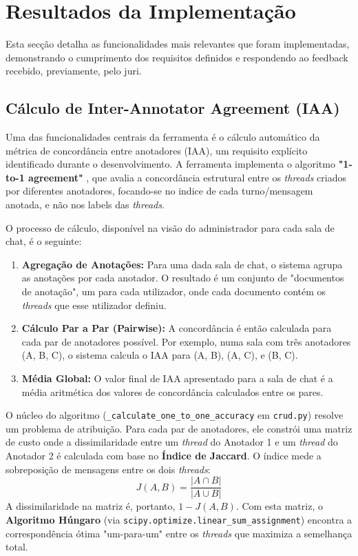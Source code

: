 \section{Resultados da Implementação}

Esta secção detalha as funcionalidades mais relevantes que foram implementadas, demonstrando o cumprimento dos requisitos definidos e respondendo ao feedback recebido, previamente, pelo juri.

\subsection{Cálculo de Inter-Annotator Agreement (IAA)}

Uma das funcionalidades centrais da ferramenta é o cálculo automático da métrica de concordância entre anotadores (IAA), um requisito explícito identificado durante o desenvolvimento. A ferramenta implementa o algoritmo \textbf{"1-to-1 agreement"} \cite{elsner2008you}, que avalia a concordância estrutural entre os \textit{threads} criados por diferentes anotadores, focando-se no indice de cada turno/mensagem anotada, e não nos labels das \textit{threads}.

O processo de cálculo, disponível na visão do administrador para cada sala de chat, é o seguinte:
\begin{enumerate}
    \item \textbf{Agregação de Anotações:} Para uma dada sala de chat, o sistema agrupa as anotações por cada anotador. O resultado é um conjunto de "documentos de anotação", um para cada utilizador, onde cada documento contém os \textit{threads} que esse utilizador definiu.
    \item \textbf{Cálculo Par a Par (Pairwise):} A concordância é então calculada para cada par de anotadores possível. Por exemplo, numa sala com três anotadores (A, B, C), o sistema calcula o IAA para (A, B), (A, C), e (B, C).
    \item \textbf{Média Global:} O valor final de IAA apresentado para a sala de chat é a média aritmética dos valores de concordância calculados entre os pares.
\end{enumerate}

O núcleo do algoritmo (\texttt{\_calculate\_one\_to\_one\_accuracy} em \texttt{crud.py}) resolve um problema de atribuição. Para cada par de anotadores, ele constrói uma matriz de custo onde a dissimilaridade entre um \textit{thread} do Anotador 1 e um \textit{thread} do Anotador 2 é calculada com base no \textbf{Índice de Jaccard}. O índice mede a sobreposição de mensagens entre os dois \textit{threads}:
\[ J(A, B) = \frac{|A \cap B|}{|A \cup B|} \]
A dissimilaridade na matriz é, portanto, \(1 - J(A, B)\). Com esta matriz, o \textbf{Algoritmo Húngaro} (via \texttt{scipy.optimize.linear\_sum\_assignment}) encontra a correspondência ótima "um-para-um" entre os \textit{threads} que maximiza a semelhança total.

